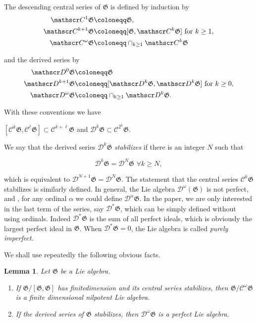 \documentclass[11pt, letterpaper, reqno]{amsart}
\newtheorem{lemma}[theorem]{Lemma}
\theoremstyle{definition}
\newcommand{\cD}{\mathscr D}
\newcommand{\Cs}{\mathscr C}
\newcommand{\fG}{\mathfrak{G}}
\begin{document}
The descending central series of $\fG$ is 
defined by induction by
\begin{align*}
\Cs^1\fG &\coloneqq\fG, \\
\Cs^{k+1}\fG &\coloneqq [\fG, \Cs^k\fG]  
\noindent{\rm\,\,for\,\,} k \ge 1,\\
\Cs^{\omega}\fG &\coloneqq \cap_{k \geq 1} \Cs^k\fG 
\end{align*}

\noindent and the derived series  by 
\begin{align*}
\cD^{0} \fG &\coloneqq \fG\\
\cD^{k +1} \fG &\coloneqq [\cD^{k} \fG, \cD^{k} \fG]\noindent{\rm\,\,for\,\,} k \ge 0,\\
\cD^{\omega}\fG &\coloneqq \cap_{k \geq 1} \cD^k\fG.
\end{align*}

\noindent With these conventions we have

\centerline{
$[\Cs^k\fG,\Cs^\ell\fG]\subset \Cs^{k+\ell}\fG$ and 
$\cD^{k} \fG\subset \Cs^{2^k}\fG$.}





\medbreak
 We say that the derived series
$\cD^k \fG$  {\it stabilizes} if
there is an integer $N$ such that

$$\cD^k\fG=\cD^N\fG \,\,\forall k\geq N,$$

\noindent which is equivalent to
$\cD^{N+1}\fG=\cD^N\fG$. The statement that  the central 
series $\Cs^k\fG$ stabilizes is similarly defined. In general, the Lie algebra 
$\cD^{\omega}(\fG)$ is not perfect, and , for any ordinal $\alpha$ we could define $\cD^{\alpha}\fG$.
In the paper, we are only interested in the last term of the series, say $\cD^*\fG$, which can be simply defined without using ordinals.
Indeed $\cD^*\fG$ is  the sum of all perfect ideals, which is obviously
the largest perfect ideal in $\fG$.
When $\cD^*\fG=0$, the Lie algebra is called
{\it purely imperfect}.


We shall use repeatedly the following  obvious facts.

\begin{lemma}\label{stabilization}
Let $\fG$ be a Lie algebra. 
\begin{enumerate}
\item[(a)] If $\fG/[\fG,\fG]$ has finitedimension and its central series stabilizes, then $\fG / \Cs^{\omega}\fG$ is a finite dimensional  nilpotent Lie algebra.

\item[(b)] If the derived series of $\fG$ stabilizes, then 
$\cD^{\omega}\fG$ is a perfect Lie algebra.

\end{enumerate}
\end{lemma}
\end{document}
